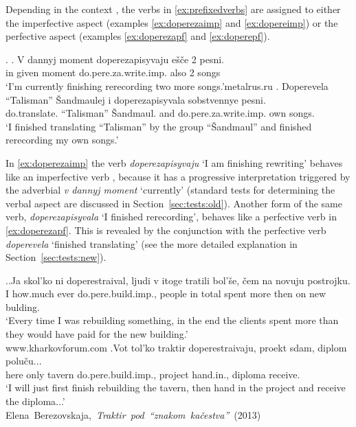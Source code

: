 Depending in the context  , the verbs in \ref{ex:prefixedverbs} are assigned to either the imperfective aspect (examples \ref{ex:doperezaimp} and \ref{ex:dopereimp}) or the perfective aspect (examples \ref{ex:doperezapf} and \ref{ex:doperepf}). 

\ex. \ag. \label{ex:doperezaimp}V dannyj moment doperezapisyvaju e\v{s}\v{c}e 2 pesni.\\
in given moment do.pere.za.write.imp. also 2 songs\\
\trans `I'm currently finishing rerecording two more songs.'\hfill metalrus.ru
\bg. \label{ex:doperezapf}Doperevela ``Talisman'' \v{S}andmaulej i doperezapisyvala sobstvennye pesni.\\
do.translate. ``Talisman'' \v{S}andmaul. and do.pere.za.write.imp. own songs.\\
\trans `I finished translating ``Talisman'' by the group ``\v{S}andmaul'' and finished rerecording my own songs.'

In \ref{ex:doperezaimp} the verb \textit{doperezapisyvaju} `I am finishing rewriting' behaves like an imperfective verb , because it has a progressive interpretation  triggered by the adverbial \textit{v dannyj moment} `currently' (standard tests for determining the verbal aspect  are discussed in Section~\ref{sec:tests:old}). Another form of the same verb, \textit{doperezapisyvala} `I finished rerecording', behaves like a perfective verb  in \ref{ex:doperezapf}. This is revealed by the conjunction  with the perfective verb  \textit{doperevela} `finished translating' (see the more detailed explanation in Section~\ref{sec:tests:new}).

\ex.\ag.\label{ex:dopereimp}Ja skol'ko ni doperestraival, ljudi v itoge tratili bol'\v{s}e, \v{c}em na novuju postrojku.\\
I how.much ever do.pere.build.imp., people in total spent more then on new bulding.\\
\trans `Every time I was rebuilding something, in the end the clients spent more than they would have paid for the new building.'\\
\hbox{}\hfill\hbox{www.kharkovforum.com}
\bg.\label{ex:doperepf}Vot tol'ko traktir doperestraivaju, proekt sdam, diplom polu\v{c}u...\\
here only tavern do.pere.build.imp., project hand.in., diploma receive.\\
\trans `I will just first finish rebuilding the tavern, then hand in the project and receive the diploma...'\\
\hbox{}\hfill\hbox{Elena Berezovskaja, \textit{Traktir pod ``znakom ka\v{c}estva''} (2013)}

